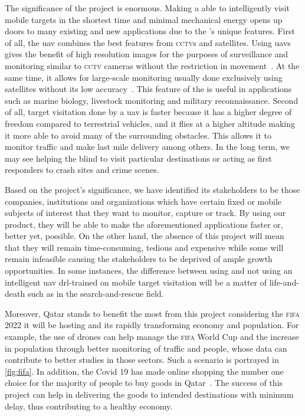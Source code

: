 \documentclass[../main.tex]{subfiles}
\begin{document}
The significance of the project is enormous. 
Making a \uav able to intelligently 
visit mobile targets in the shortest time
and minimal mechanical energy 
opens up doors to many existing and new applications
due to the \uav's unique features.
First of all, the \gls{uav} combines the best features
from \textsc{cctv}s and satellites.
Using \glspl{uav} gives the benefit of high resolution images
for the purposes of surveillance and monitoring
similar to \textsc{cctv} cameras 
without the restriction in movement~\cite{Sha19}.
At the same time, it allows for large-scale monitoring 
usually done exclusively using satellites 
without its low accuracy~\cite{Sha19}.
This feature of the \uav is useful in applications
such as marine biology, livestock monitoring and military
reconnaissance.
Second of all, target visitation done by a \gls{uav}
is faster because it has a higher degree of freedom
compared to terrestrial vehicles, and
it flies at a higher altitude 
making it more able to avoid 
many of the surrounding obstacles.
This allows it to monitor traffic and make last mile delivery
among others. In the long term, we may see \uavs helping the
blind to visit particular destinations or acting as first
responders to crash sites and crime scenes.

Based on the project's significance, we have identified 
its stakeholders to be 
those companies, institutions and organizations which
have certain fixed or mobile subjects of interest 
that they want to monitor, capture or track.
By using our product,
they will be able to make the aforementioned applications
faster or,
better yet, possible.
On the other hand, the absence of this project will mean that
they will remain
time-consuming, tedious and expensive
while some will remain infeasible
causing the stakeholders to be deprived of ample growth opportunities.
In some instances, the difference between using 
and not using an intelligent \gls{uav} 
\gls{drl}-trained on mobile target visitation
will be a matter of life-and-death
such as in the search-and-rescue field.

Moreover, Qatar stands to benefit the most from this project 
considering the \textsc{fifa} 2022 it will be hosting
and its rapidly transforming economy and population.
For example, the use of drones can help manage 
the \textsc{fifa} World Cup 
and the increase in population through better monitoring 
of traffic and people, whose data can contribute
to better studies in those sectors. Such a scenario 
is portrayed in \cref{fig:fifa}.
In addition, the Covid 19 has made online shopping
the number one choice for 
the majority of people to buy goods in Qatar~\cite{Has20}.
The success of this project can help in delivering
the goods to intended destinations with minimum delay,
thus contributing to a healthy economy.
\end{document}
